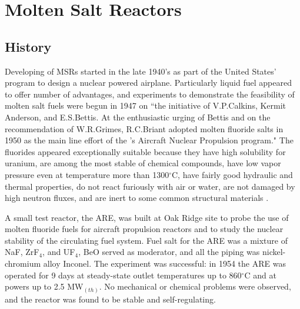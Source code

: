 \chapter[Molten Salt Reactors]{Molten Salt Reactors}


\section{History}
Developing of \glspl{MSR} started in the late 1940's as part of the United States' program to design a nuclear powered airplane. Particularly  liquid fuel appeared to offer number of advantages, and experiments to demonstrate the feasibility of molten salt fuels were begun in 1947 on ``the initiative of V.P.Calkins, Kermit Anderson, and E.S.Bettis. At the enthusiastic urging of Bettis and on the recommendation of W.R.Grimes, R.C.Briant adopted molten fluoride salts in 1950 as the main line effort of the 's Aircraft Nuclear Propulsion program." The fluorides appeared exceptionally suitable because they have high solubility for uranium, are among the most stable of chemical compounds, have low vapor pressure even at temperature more than 1300$^{\circ}$C, have fairly good hydraulic and thermal properties, do not react furiously with air or water, are not damaged by high neutron fluxes, and are inert to some common structural materials \cite{rosenthal_molten-salt_1970}.

A small test reactor, the \gls{ARE}, was built at Oak Ridge site to probe the use of molten fluoride fuels for aircraft propulsion reactors and to study the nuclear stability of the circulating fuel system. Fuel salt for the \gls{ARE} was a mixture of NaF, ZrF$_4$, and UF$_4$, BeO served as moderator, and all the piping was nickel-chromium alloy Inconel. The experiment was successful: in 1954 the \gls{ARE} was operated for 9 days at steady-state outlet temperatures up to 860$^{\circ}$C and at powers up to 2.5 MW$_{(th)}$. No mechanical or chemical problems were observed, and the reactor was found to be stable and self-regulating.

